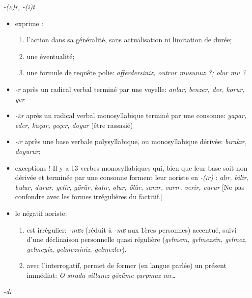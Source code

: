 \documentclass{cours}
\newcommand{\ch}{\c{s}}
\newcommand{\sci}{\textsc{i}}
\newcommand{\sce}{\textsc{e}}
\begin{document}
\begin{description}
\begin{itemize}
          \end{itemize}
    \item [L'éventuel ou \og temps large\fg (geni\ch\ zaman) (aoriste):] \textit{-(\sce)r, -(i)t}
          \begin{itemize}
              \item exprime :
                    \begin{enumerate}
                        \item l'action dans sa généralité, sans actualisation ni limitation de durée;
                        \item une éventualité;
                        \item une formule de requête polie: \textit{afferdersiniz, outrur musunuz ?; olur mu ?}
                    \end{enumerate}
              \item \textit{-r} après un radical verbal terminé par une voyelle: \textit{anlar, benzer, der, korur, yer}
              \item \textit{-\sce r} après un radical verbal monosyllabique terminé par une consonne: \textit{yapar, eder, kaçar, geçer, doyar} (être rassasié)
              \item \textit{-\sci r} après une base verbale polysyllabique, ou monosyllabique dérivée: \textit{b\i rak\i r, doyurur};
              \item exceptions ! Il y a 13 verbes monosyllabiques qui, bien que leur base soit non dérivée et terminée par une consonne forment leur aoriste en \textit{-(\sci r)} : \textit{al\i r, bilir, bulur, durur, gelir, görür, kal\i r, olur, ölür, san\i r, var\i r, verir, vurur} [Ne pas confondre avec les formes irrégulières du factitif.]
              \item le négatif aoriste:
                    \begin{enumerate}
                        \item est irrégulier: \textit{-m\sce z} (réduit à \textit{-m\sce} aux 1ères personnes) accentué, suivi d'une déclinaison personnelle quasi régulière (\textit{gelmem, gelmezsin, gelmez, gelmeyiz, gelmezsiniz, gelmezler}).
                        \item avec l'interrogatif, permet de former (en langue parlée) un présent immédiat: \textit{O s\i rada villan\i z gözüme çarpmaz m\i\dots}
                    \end{enumerate}
          \end{itemize}
    \item [Constatif:] \textit{-d\sci}

\end{description}
\end{document}
